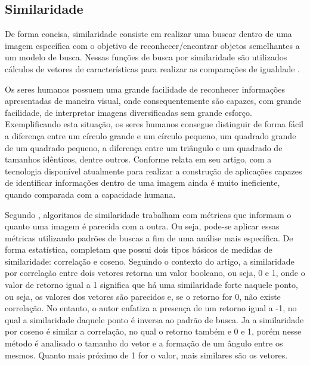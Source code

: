 \subsection{\textbf{Similaridade}}

De forma concisa, similaridade consiste em realizar uma buscar dentro de uma imagem específica com o objetivo de reconhecer/encontrar objetos semelhantes a um modelo de busca. Nessas funções de busca por similaridade são utilizados cálculos de vetores de características para realizar as comparações de igualdade \cite{MAIZA2013}.

Os seres humanos possuem uma grande facilidade de reconhecer informações apresentadas de maneira visual, onde consequentemente são capazes, com grande facilidade, de interpretar imagens diversificadas sem grande esforço. Exemplificando esta situação, os seres humanos consegue distinguir de forma fácil a diferença entre um círculo grande e um círculo pequeno, um quadrado grande de um quadrado pequeno, a diferença entre um triângulo e um quadrado de tamanhos idênticos, dentre outros. Conforme  relata em seu artigo, com a tecnologia disponível atualmente para realizar a construção de aplicações capazes de identificar informações dentro de uma imagem ainda é muito ineficiente, quando comparada com a capacidade humana.

Segundo , algoritmos de similaridade trabalham com métricas que informam o quanto uma imagem é parecida com a outra. Ou seja, pode-se aplicar essas métricas utilizando padrões de buscas a fim de uma análise mais específica. De forma estatística,  completam que possui dois tipos básicos de medidas de similaridade: correlação e coseno. Seguindo o contexto do artigo, a similaridade por correlação entre dois vetores retorna um valor booleano, ou seja, 0 e 1, onde o valor de retorno igual a 1 significa que há uma similaridade forte naquele ponto, ou seja, os valores dos vetores são parecidos e, se o retorno for 0, não existe correlação. No entanto, o autor enfatiza a presença de um retorno igual a -1, no qual a similaridade daquele ponto é inversa ao padrão de busca. Ja a similaridade por coseno é similar a correlação, no qual o retorno também e 0 e 1, porém nesse método é analisado o tamanho do vetor e a formação de um ângulo entre os mesmos. Quanto mais próximo de 1 for o valor, mais similares são os vetores.

